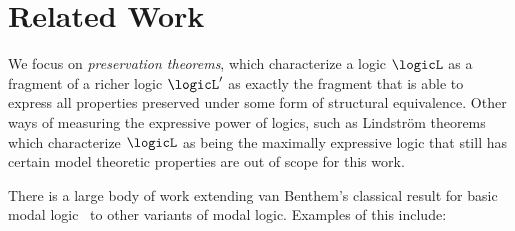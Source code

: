\section{Related Work}\label{sec:related-work}
We focus on \emph{preservation theorems}, which characterize a logic $\logicL$ as a fragment of a richer logic $\logicL'$ as exactly the fragment that is able to express all properties preserved under some form of structural equivalence.
Other ways of measuring the expressive power of logics, such as Lindström theorems~\cite{lindstrom1969, benthem2009} which characterize $\logicL$ as being the maximally expressive logic that still has certain model theoretic properties are out of scope for this work.

There is a large body of work extending van Benthem's classical result for basic modal logic~\cite{van1983modal} to other variants of modal logic.
Examples of this include:
